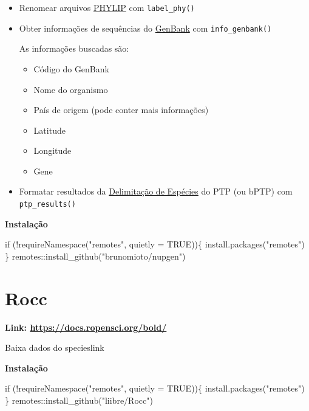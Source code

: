 \documentclass[
  letterpaper,
  DIV=11,
  numbers=noendperiod]{scrreprt}
\newenvironment{Shaded}{\begin{snugshade}}{\end{snugshade}}
\newcommand{\AttributeTok}[1]{\textcolor[rgb]{0.40,0.45,0.13}{#1}}
\newcommand{\ConstantTok}[1]{\textcolor[rgb]{0.56,0.35,0.01}{#1}}
\newcommand{\ControlFlowTok}[1]{\textcolor[rgb]{0.00,0.23,0.31}{#1}}
\newcommand{\FunctionTok}[1]{\textcolor[rgb]{0.28,0.35,0.67}{#1}}
\newcommand{\NormalTok}[1]{\textcolor[rgb]{0.00,0.23,0.31}{#1}}
\newcommand{\SpecialCharTok}[1]{\textcolor[rgb]{0.37,0.37,0.37}{#1}}
\newcommand{\StringTok}[1]{\textcolor[rgb]{0.13,0.47,0.30}{#1}}
\begin{document}
\begin{itemize}
\item
  Renomear arquivos \protect\hyperlink{phyml}{PHYLIP} com
  \texttt{label\_phy()}
\item
  Obter informações de sequências do
  \protect\hyperlink{genbank}{GenBank} com \texttt{info\_genbank()}

  As informações buscadas são:

  \begin{itemize}
  \item
    Código do GenBank
  \item
    Nome do organismo
  \item
    País de origem (pode conter mais informações)
  \item
    Latitude
  \item
    Longitude
  \item
    Gene
  \end{itemize}
\item
  Formatar resultados da
  \protect\hyperlink{delimitadores-de-especies}{Delimitação de Espécies}
  do PTP (ou bPTP) com \texttt{ptp\_results()}
\end{itemize}

\textbf{Instalação}

\begin{Shaded}
\begin{Highlighting}[]
\ControlFlowTok{if}\NormalTok{ (}\SpecialCharTok{!}\FunctionTok{requireNamespace}\NormalTok{(}\StringTok{"remotes"}\NormalTok{, }\AttributeTok{quietly =} \ConstantTok{TRUE}\NormalTok{))\{}
    \FunctionTok{install.packages}\NormalTok{(}\StringTok{"remotes"}\NormalTok{)}
\NormalTok{  \}}
\NormalTok{remotes}\SpecialCharTok{::}\FunctionTok{install\_github}\NormalTok{(}\StringTok{"brunomioto/nupgen"}\NormalTok{)}
\end{Highlighting}
\end{Shaded}

\hypertarget{rocc}{%
\section{Rocc}\label{rocc}}

\textbf{Link: \url{https://docs.ropensci.org/bold/}}

Baixa dados do specieslink

\textbf{Instalação}

\begin{Shaded}
\begin{Highlighting}[]
\ControlFlowTok{if}\NormalTok{ (}\SpecialCharTok{!}\FunctionTok{requireNamespace}\NormalTok{(}\StringTok{"remotes"}\NormalTok{, }\AttributeTok{quietly =} \ConstantTok{TRUE}\NormalTok{))\{}
    \FunctionTok{install.packages}\NormalTok{(}\StringTok{"remotes"}\NormalTok{)}
\NormalTok{  \}}
\NormalTok{remotes}\SpecialCharTok{::}\FunctionTok{install\_github}\NormalTok{(}\StringTok{"liibre/Rocc"}\NormalTok{)}
\end{Highlighting}
\end{Shaded}
\end{document}
